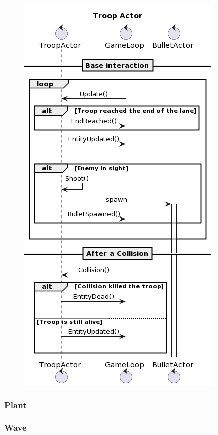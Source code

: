 \begin{figure}[H]
    \centering
    \includegraphics[width=\linewidth]{images/troop-actor.png}
    \label{Diagramma di sequenza del Troop Actor.}
\end{figure}

\subsubsection{Plant}

\subsubsection{Wave}